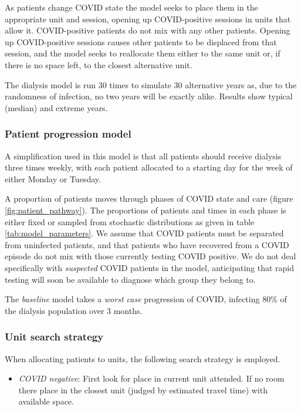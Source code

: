 \begin{multicols}{2}
As patients change COVID state the model seeks to place them in the appropriate unit and session, opening up COVID-positive sessions in units that allow it. COVID-positive patients do not mix with any other patients. Opening up COVID-positive sessions causes other patients to be displaced from that session, and the model seeks to reallocate them either to the same unit or, if there is no space left, to the closest alternative unit.

The dialysis model is run 30 times to simulate 30 alternative years as, due to the randomness of infection, no two years will be exactly alike. Results show typical (median) and extreme years.

\subsubsection{Patient progression model}
A simplification used in this model is that all patients should receive dialysis three times weekly, with each patient allocated to a starting day for the week of either Monday or Tuesday.

A proportion of patients moves through phases of COVID state and care (figure \ref{fig:patient_pathway}). The proportions of patients and times in each phase is either fixed or sampled from stochastic distributions as given in table \ref{tab:model_parameters}. We assume that COVID patients must be separated from uninfected patients, and that patients who have recovered from a COVID episode do not mix with those currently testing COVID positive. We do not deal specifically with \emph{suspected} COVID patients in the model, anticipating that rapid testing will soon be available to diagnose which group they belong to.

The \emph{baseline} model takes a \emph{worst case} progression of COVID, infecting 80\% of the dialysis population over 3 months.

\subsubsection{Unit search strategy}

When allocating patients to units, the following search strategy is employed.

\begin{itemize}
\item \emph{COVID negative}: First look for place in current unit attended. If no room there place in the closest unit (judged by estimated travel time) with available space.


\end{itemize}
\end{multicols}

